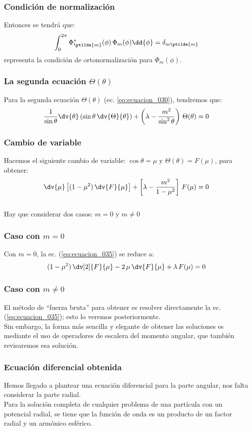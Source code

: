 \begin{frame}
\frametitle{Condición de normalización}
Entonces se tendrá que:
\begin{align}
\int_{0}^{2 \pi} \Phi_{\ptilde{m}}^{*}(\phi) \, \Phi_{m}(\phi) \dd{\phi} = \delta_{m \ptilde{m}}
\label{eq:ecuacion_033}
\end{align}
representa la condición de ortonormalización para $\Phi_{m}(\phi)$.
\end{frame}
\begin{frame}
\frametitle{La segunda ecuación $\Theta(\theta)$}
Para la segunda ecuación $\Theta (\theta)$ (ec. \ref{eq:ecuacion_030}), tendremos que:
\fontsize{12}{12}\selectfont
\begin{align}
\dfrac{1}{\sin \theta} \dv{\theta} \left( \sin \theta \, \dv{\Theta}{\theta} \right) + \left( \lambda - \dfrac{m^{2}}{\sin^{2} \theta} \right) \, \Theta (\theta) = 0
\label{eq:ecuacion_034}
\end{align}
\end{frame}
\begin{frame}
\frametitle{Cambio de variable}
Hacemos el siguiente cambio de variable: $\cos \theta = \mu$ y $\Theta(\theta) = F(\mu)$, para obtener:
\pause
\fontsize{12}{12}\selectfont
\begin{align}
\dv{\mu} \left[ (1 - \mu^{2}) \, \dv{F}{\mu} \right] + \left[ \lambda - \dfrac{m^{2}}{1 - \mu^{2}} \right] \, F(\mu) = 0
\label{eq:ecuacion_035}
\end{align}
\\
\bigskip
\pause
Hay que considerar dos casos: $m = 0$ y $m \neq 0$
\end{frame}
\begin{frame}
\frametitle{Caso con $m = 0$}
Con $m = 0$, la ec. (\ref{eq:ecuacion_035}) se reduce a:
\begin{align}
(1 - \mu^{2}) \, \dv[2]{F}{\mu} - 2  \, \mu \, \dv{F}{\mu} + \lambda \, F(\mu) = 0
\label{eq:ecuacion_036}
\end{align}
\end{frame}
\begin{frame}
\frametitle{Caso con $m \neq 0$}
El método de \enquote{fuerza bruta} para obtener es resolver directamente la ec. (\ref{eq:ecuacion_035}); esto lo veremos posteriormente.
\\
\bigskip
\pause
Sin embargo, la forma más sencilla y elegante de obtener las soluciones es mediante el uso de operadores de escalera del momento angular, que también revisaremos esa solución.
\end{frame}
\begin{frame}
\frametitle{Ecuación diferencial obtenida}
Hemos llegado a plantear una ecuación diferencial para la parte angular, nos falta considerar la parte radial.
\\
\bigskip
Para la solución completa de cualquier problema de una partícula con un potencial radial, se tiene que la función de onda es un producto de un factor radial y un armónico esférico.
\end{frame}
